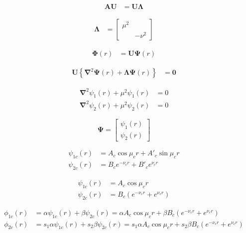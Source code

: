 \begin{align}
    \pmb{A}\pmb{U} &= \pmb{U}\pmb{\Lambda}
\end{align}

\begin{align}
    \pmb{\Lambda} &= \begin{bmatrix}
        \mu^2 & \\
         & -\nu^2
    \end{bmatrix}
\end{align}

\begin{align}
    \pmb{\Phi}(r) &= \pmb{U}\pmb{\Psi}(r)
\end{align}

\begin{align}
    \pmb{U}\left\{\pmb{\nabla}^2\pmb{\Psi}(r)+\pmb{\Lambda}\pmb{\Psi}(r)\right\} &= \pmb{0}
\end{align}

\begin{align}
    \pmb{\nabla}^2\psi_1(r) + \mu^2\psi_1(r) &= 0 \\
    \pmb{\nabla}^2\psi_2(r) + \mu^2\psi_2(r) &= 0
\end{align}

\begin{equation}
    \pmb{\Psi} = \begin{bmatrix}
        \psi_1(r) \\
        \psi_2(r)
    \end{bmatrix}
\end{equation}

\begin{align}
    \psi_{1c}(r) &= A_c\cos{\mu_c r} + A'_c\sin{\mu_c r} \\
    \psi_{2c}(r) &= B_c e^{-\nu_c r} + B'_c e^{\nu_c r}
\end{align}

\begin{align}
    \psi_{1c}(r) &= A_c\cos{\mu_c r} \\
    \psi_{2c}(r) &= B_c\left(e^{-\nu_c r} + e^{\nu_c r}\right)
\end{align}

\begin{align}
    \phi_{1c}(r) &= \alpha\psi_{1c}(r) + \beta\psi_{2c}(r) = \alpha A_c\cos{\mu_c r} + \beta B_c\left(e^{-\nu_c r} + e^{\nu_c r}\right) \\
    \phi_{2c}(r) &= s_1\alpha\psi_{1c}(r) + s_2\beta\psi_{2c}(r) = s_1\alpha A_c\cos{\mu_c r} + s_2\beta B_c\left(e^{-\nu_c r} + e^{\nu_c r}\right)
\end{align}

